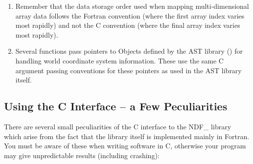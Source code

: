 \begin{enumerate}
\item Remember that the data storage order used when mapping
multi-dimensional array data follows the Fortran convention (where the
first array index varies most rapidly) and not the C convention (where
the final array index varies most rapidly).

\item Several functions pass pointers to Objects defined by the AST
library () for handling world coordinate
system information. These use the same C argument passing conventions
for these pointers as used in the AST library itself.
\end{enumerate}

\subsection{Using the C Interface -- a Few Peculiarities}

There are several small peculiarities of the C interface to the NDF\_
library which arise from the fact that the library itself is
implemented mainly in Fortran. You must be aware of these when writing
software in C, otherwise your program may give unpredictable results
(including crashing):

